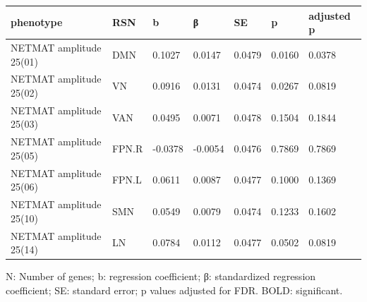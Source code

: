 \begin{refsection}
\begin{table}[H]
\small
{}\selectfont
{} \label{table3S8} 
\centering
\begin{tabular}{@{}lllllll@{}}
\hline
phenotype               & RSN & b       & β       & SE     & p & adjusted p \\ \hline
NETMAT amplitude 25(01) & DMN                & 0.1027  & 0.0147  & 0.0479 & 0.0160  & 0.0378           \\
NETMAT amplitude 25(02) & VN                 & 0.0916  & 0.0131  & 0.0474 & 0.0267  & 0.0819           \\
NETMAT amplitude 25(03) & VAN                & 0.0495  & 0.0071  & 0.0478 & 0.1504  & 0.1844           \\
NETMAT amplitude 25(05) & FPN.R              & -0.0378 & -0.0054 & 0.0476 & 0.7869  & 0.7869           \\
NETMAT amplitude 25(06) & FPN.L              & 0.0611  & 0.0087  & 0.0477 & 0.1000  & 0.1369           \\
NETMAT amplitude 25(10) & SMN                & 0.0549  & 0.0079  & 0.0474 & 0.1233  & 0.1602           \\
NETMAT amplitude 25(14) & LN                 & 0.0784  & 0.0112  & 0.0477 & 0.0502  & 0.0819           \\ \hline
\end{tabular}
N: Number of genes; b: regression coefficient; β: standardized regression coefficient; SE: standard error; p values adjusted for FDR. BOLD: significant.
\end{table}



\end{refsection}
